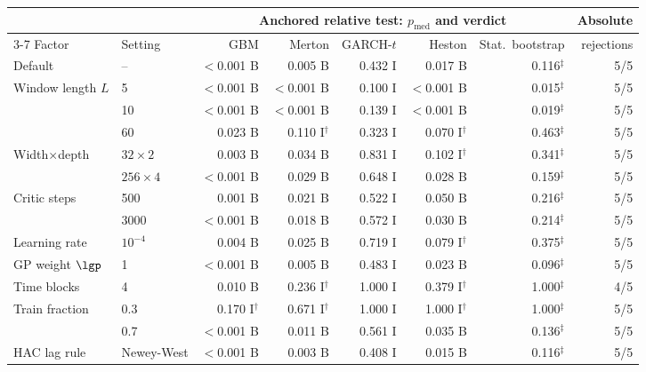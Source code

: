 \begin{tabular}{llrrrrrr}
\toprule
 & & \multicolumn{5}{c}{Anchored relative test: $p_{\mathrm{med}}$ and verdict} & Absolute \\
\cmidrule(lr){3-7}
Factor & Setting & GBM & Merton & GARCH-$t$ & Heston & Stat.\ bootstrap & rejections \\
\midrule
Default & -- & $<$0.001 B & 0.005 B & 0.432 I & 0.017 B & 0.116$^\ddagger$ & 5/5 \\
Window length $L$ & 5 & $<$0.001 B & $<$0.001 B & 0.100 I & $<$0.001 B & 0.015$^\ddagger$ & 5/5 \\
 & 10 & $<$0.001 B & $<$0.001 B & 0.139 I & $<$0.001 B & 0.019$^\ddagger$ & 5/5 \\
 & 60 & 0.023 B & 0.110 I$^\dagger$ & 0.323 I & 0.070 I$^\dagger$ & 0.463$^\ddagger$ & 5/5 \\
Width$\times$depth & $32\times2$ & 0.003 B & 0.034 B & 0.831 I & 0.102 I$^\dagger$ & 0.341$^\ddagger$ & 5/5 \\
 & $256\times4$ & $<$0.001 B & 0.029 B & 0.648 I & 0.028 B & 0.159$^\ddagger$ & 5/5 \\
Critic steps & 500 & 0.001 B & 0.021 B & 0.522 I & 0.050 B & 0.216$^\ddagger$ & 5/5 \\
 & 3000 & $<$0.001 B & 0.018 B & 0.572 I & 0.030 B & 0.214$^\ddagger$ & 5/5 \\
Learning rate & $10^{-4}$ & 0.004 B & 0.025 B & 0.719 I & 0.079 I$^\dagger$ & 0.375$^\ddagger$ & 5/5 \\
GP weight $\lgp$ & 1 & $<$0.001 B & 0.005 B & 0.483 I & 0.023 B & 0.096$^\ddagger$ & 5/5 \\
Time blocks & 4 & 0.010 B & 0.236 I$^\dagger$ & 1.000 I & 0.379 I$^\dagger$ & 1.000$^\ddagger$ & 4/5 \\
Train fraction & 0.3 & 0.170 I$^\dagger$ & 0.671 I$^\dagger$ & 1.000 I & 1.000 I$^\dagger$ & 1.000$^\ddagger$ & 5/5 \\
 & 0.7 & $<$0.001 B & 0.011 B & 0.561 I & 0.035 B & 0.136$^\ddagger$ & 5/5 \\
HAC lag rule & Newey-West & $<$0.001 B & 0.003 B & 0.408 I & 0.015 B & 0.116$^\ddagger$ & 5/5 \\
\bottomrule
\end{tabular}
